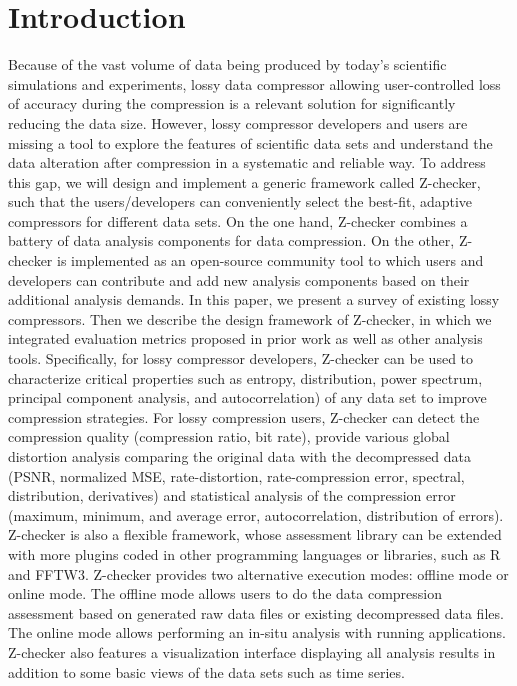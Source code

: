 \section{Introduction}

Because of the vast volume of data being produced by today's scientific simulations and experiments, lossy data compressor allowing user-controlled loss of accuracy during the compression is a relevant solution for significantly reducing the data size. However, lossy compressor developers and users are missing a tool to explore the features of scientific data sets and understand the data alteration after compression in a systematic and reliable way. To address this gap, we will design and implement a generic framework called Z-checker, such that the users/developers can conveniently select the best-fit, adaptive compressors for different data sets. On the one hand, Z-checker combines a battery of data analysis components for data compression. On the other, Z-checker is implemented as an open-source community tool to which users and developers can contribute and add new analysis components based on their additional analysis demands. In this paper, we present a survey of existing lossy compressors. Then we describe the design framework of Z-checker, in which we integrated evaluation metrics proposed in prior work as well as other analysis tools. Specifically, for lossy compressor developers, Z-checker can be used to characterize critical properties such as entropy, distribution, power spectrum, principal component analysis, and autocorrelation) of any data set to improve compression strategies. For lossy compression users, Z-checker can detect the compression quality (compression ratio, bit rate), provide various global distortion analysis comparing the original data with the decompressed data (PSNR, normalized MSE, rate-distortion, rate-compression error, spectral, distribution, derivatives) and statistical analysis of the compression error (maximum, minimum, and average error, autocorrelation, distribution of errors). Z-checker is also a flexible framework, whose assessment library can be extended with more plugins coded in other programming languages or libraries, such as R and FFTW3. Z-checker provides two alternative execution modes: offline mode or online mode. The offline mode allows users to do the data compression assessment based on generated raw data files or existing decompressed data files. The online mode allows performing an in-situ analysis with running applications. Z-checker also features a visualization interface displaying all analysis results in addition to some basic views of the data sets such as time series.
